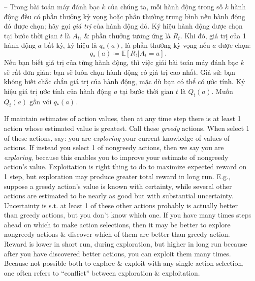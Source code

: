 \documentclass{article}
\begin{document}
\begin{itemize}
\begin{itemize}
        -- Trong bài toán máy đánh bạc $k$ của chúng ta, mỗi hành động trong số $k$ hành động đều có phần thưởng kỳ vọng hoặc phần thưởng trung bình nếu hành động đó được chọn; hãy gọi {\it giá trị} của hành động đó. Ký hiệu hành động được chọn tại bước thời gian $t$ là $A_t$, \& phần thưởng tương ứng là $R_t$. Khi đó, giá trị của 1 hành động $a$ bất kỳ, ký hiệu là $q_*(a)$, là phần thưởng kỳ vọng nếu $a$ được chọn:
        \begin{equation*}
            q_*(a)\coloneqq\mathbb{E}[R_t|A_t = a].
        \end{equation*}
        Nếu bạn biết giá trị của từng hành động, thì việc giải bài toán máy đánh bạc $k$ sẽ rất đơn giản: bạn sẽ luôn chọn hành động có giá trị cao nhất. Giả sử: bạn không biết chắc chắn giá trị của hành động, mặc dù bạn có thể có ước tính. Ký hiệu giá trị ước tính của hành động $a$ tại bước thời gian $t$ là $Q_t(a)$. Muốn $Q_t(a)$ gần với $q_*(a)$.

        If maintain estimates of action values, then at any time step there is at least 1 action whose estimated value is greatest. Call these {\it greedy} actions. When select 1 of these actions, say: you are {\it exploring} your current knowledge of values of actions. If instead you select 1 of nongreedy actions, then we say you are {\it exploring}, because this enables you to improve your estimate of nongreedy action's value. Exploitation is right thing to do to maximize expected reward on 1 step, but exploration may produce greater total reward in long run. E.g., suppose a greedy action's value is known with certainty, while several other actions are estimated to be nearly as good but with substantial uncertainty. Uncertainty is s.t. at least 1 of these other actions probably is actually better than greedy actions, but you don't know which one. If you have many times steps ahead on which to make action selections, then it may be better to explore nongreedy actions \& discover which of them are better than greedy action. Reward is lower in short run, during exploration, but higher in long run because after you have discovered better actions, you can exploit them many times. Because not possible both to explore \& exploit with any single action selection, one often refers to ``conflict'' between exploration \& exploitation.


\end{itemize}
\end{itemize}
\end{document}
